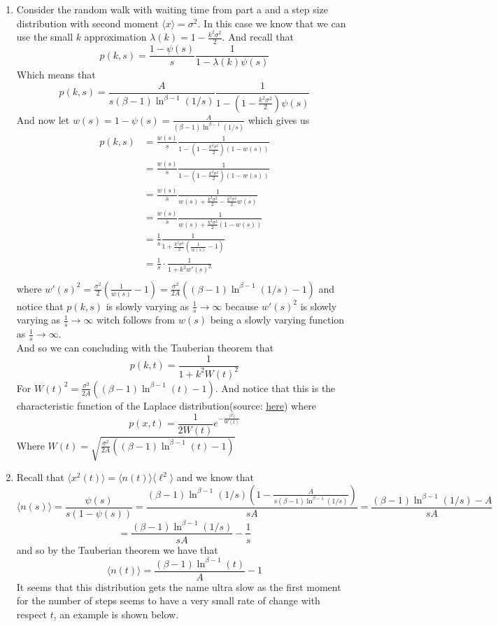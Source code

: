 \documentclass[12pt]{amsart}
\theoremstyle{definition}
\newcommand{\ra}{\rightarrow}
\newcommand{\ip}[1]{\langle#1\rangle}
\begin{document}
\begin{itemize}
\begin{enumerate}[label=(\alph*)]
    \item Consider the random walk with waiting time from part a and a step size distribution with second moment $\ip x = \sigma^2$. In this case we know that we can use the small $k$ approximation $\lambda(k) = 1-\frac{k^2\sigma^2}{2}$. And recall that 
    $$p(k,s)=\frac{1-\psi(s)}{s}\frac{1}{1-\lambda(k)\psi(s)}$$
    Which means that 
    $$p(k,s)=\frac{A}{s(\beta-1)\ln^{\beta-1}(1/s)}\frac{1}{1-(1-\frac{k^2\sigma^2}{2})\psi(s)}$$
    And now let $w(s)=1-\psi(s)=\frac{A}{(\beta-1)\ln^{\beta-1}(1/s)}$ which gives us 
    \begin{align*}
        p(k,s)&=\frac{w(s)}{s}\frac{1}{1-(1-\frac{k^2\sigma^2}{2})(1-w(s))}\\&=\frac{w(s)}{s}\frac{1}{1-(1-\frac{k^2\sigma^2}{2})(1-w(s))}\\
        &=\frac{w(s)}{s}\frac{1}{w(s)+\frac{k^2\sigma^2}{2}-\frac{k^2\sigma^2}{2}w(s)}\\
        &=\frac{w(s)}{s}\frac{1}{w(s)+\frac{k^2\sigma^2}{2}(1-w(s))}\\
        &=\frac{1}{s}\frac{1}{1+\frac{k^2\sigma^2}{2}(\frac{1}{w(s)}-1)}\\
        &=\frac{1}{s}\cdot\frac{1}{1+k^2w'(s)^2}\\
    \end{align*}
    where $w'(s)^2=\frac{\sigma^2}{2}(\frac{1}{w(s)}-1)=\frac{\sigma^2}{2A}((\beta-1)\ln^{\beta-1}(1/s)-1)$ and notice that $p(k,s)$ is slowly varying as $\frac{1}{s}\ra \infty$ because $w'(s)^2$ is slowly varying as $\frac{1}{s}\ra \infty$ witch follows from $w(s)$ being a slowly varying function as $\frac{1}{s}\ra \infty$.\\

    And so we can concluding with the Tauberian theorem that 
    $$p(k,t)=\frac{1}{1+k^2W(t)^2}$$
    For $W(t)^2=\frac{\sigma^2}{2A}((\beta-1)\ln^{\beta-1}(t)-1)$. And notice that this is the characteristic function of the Laplace distribution(source: \href{https://en.wikipedia.org/wiki/Characteristic_function_(probability_theory)}{here}) where
    $$p(x,t)=\frac{1}{2W(t)}e^{-\frac{|x|}{W(t)}}$$
    Where $W(t)=\sqrt{\frac{\sigma^2}{2A}((\beta-1)\ln^{\beta-1}(t)-1)}$\\

    \item Recall that $\ip{x^2(t)}=\ip{n(t)}\ip{\ell^2}$ and we know that 
    $$\ip{n(s)}=\frac{\psi(s)}{s(1-\psi(s))}=\frac{(\beta-1)\ln^{\beta-1}(1/s)(1-\frac{A}{s(\beta-1)\ln^{\beta-1}(1/s)})}{sA}=\frac{(\beta-1)\ln^{\beta-1}(1/s)-A}{sA}$$
    $$=\frac{(\beta-1)\ln^{\beta-1}(1/s)}{sA}-\frac{1}{s}$$
    and so by the Tauberian theorem we have that
    $$\ip{n(t)}=\frac{(\beta-1)\ln^{\beta-1}(t)}{A}-1$$
    It seems that this distribution gets the name ultra slow as the first moment for the number of steps seems to have a very small rate of change with respect $t$, an example is shown below.
    

\end{enumerate}
\end{itemize}
\end{document}
